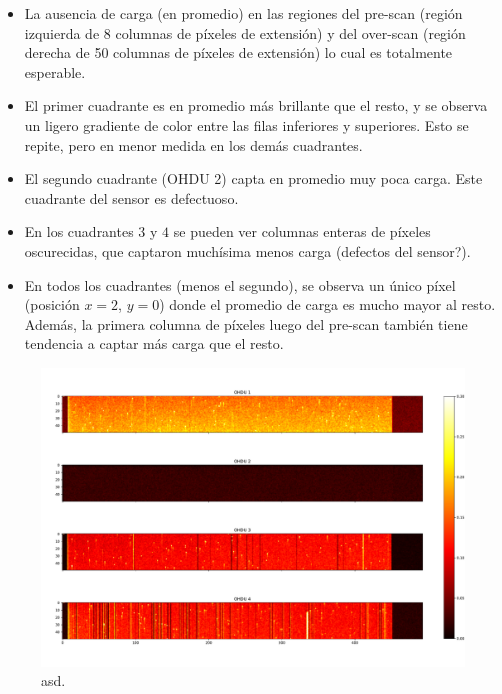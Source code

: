 \begin{itemize}
    \item La ausencia de carga (en promedio) en las regiones del pre-scan (región izquierda de 8 columnas de píxeles de extensión) y del over-scan (región derecha de 50 columnas de píxeles de extensión) lo cual es totalmente esperable.
    \item El primer cuadrante es en promedio más brillante que el resto, y se observa un ligero gradiente de color entre las filas inferiores y superiores. Esto se repite, pero en menor medida en los demás cuadrantes.
    \item El segundo cuadrante (OHDU 2) capta en promedio muy poca carga. Este cuadrante del sensor es defectuoso.
    \item En los cuadrantes $3$ y $4$ se pueden ver columnas enteras de píxeles oscurecidas, que captaron muchísima menos carga (defectos del sensor?).
    \item En todos los cuadrantes (menos el segundo), se observa un único píxel (posición $x = 2$, $y = 0$) donde el promedio de carga es mucho mayor al resto. Además, la primera columna de píxeles luego del pre-scan también tiene tendencia a captar más carga que el resto.
\end{itemize}

\begin{figure}[H]
    \centering
    \includegraphics[scale=0.4]{Figs/1ePromedio.pdf}
    \caption{\footnotesize{asd.}}
    \label{fig:Eventos1e}
\end{figure}

